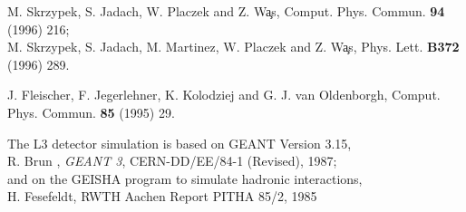 \documentclass[12pt,a4paper,dvips]{article}
\begin{document}
\begin{mcbibliography}{10}
M. Skrzypek, S. Jadach, W. Placzek and Z. W\c{a}s,
  Comput. Phys. Commun. {\bf 94}  (1996) 216;\\
M. Skrzypek, S. Jadach, M. Martinez, W. Placzek and Z. W\c{a}s,
  Phys. Lett. {\bf B372}  (1996) 289.

J. Fleischer, F. Jegerlehner, K. Kolodziej and G. J. van Oldenborgh,
  Comput. Phys. Commun. {\bf 85}  (1995) 29.

The L3 detector simulation is based on GEANT Version 3.15,\\ R. Brun \etal,
  {\em GEANT 3}, CERN-DD/EE/84-1 (Revised), 1987; \\ and on the GEISHA program
  to simulate hadronic interactions, \\ H. Fesefeldt, RWTH Aachen Report PITHA
  85/2, 1985

\end{mcbibliography}

\newpage
\typeout{   }     
\typeout{   }
%
%
%
%
%
%
\end{document}
